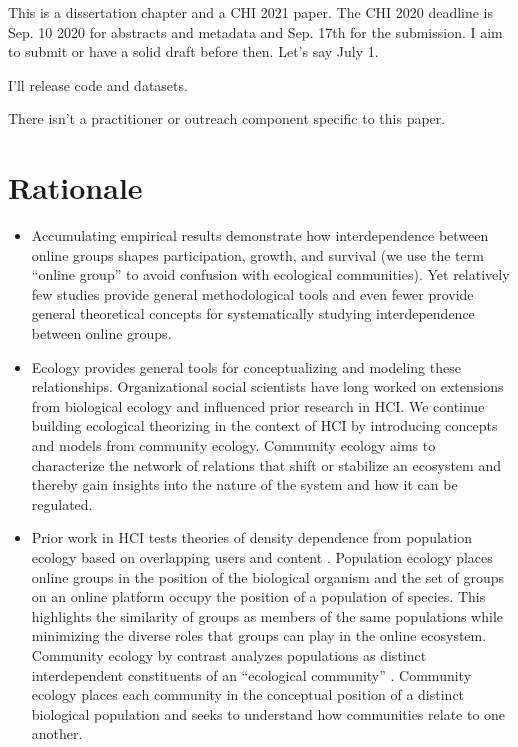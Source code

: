 \documentclass[12pt]{memoir}
\begin{document}
This is a dissertation chapter and a CHI 2021 paper. The CHI 2020 deadline is Sep. 10 2020 for abstracts and metadata and Sep. 17th for the submission. I aim to submit or have a solid draft before then. Let's say July 1. 

I'll release code and datasets.

There isn't a practitioner or outreach component specific to this paper. 

\section{Rationale}

\begin{itemize}
\item Accumulating empirical results demonstrate how interdependence between online groups shapes participation, growth, and survival (we use the term ``online group'' to avoid confusion with ecological communities).  Yet relatively few studies provide general methodological tools and even fewer provide general theoretical concepts for systematically studying interdependence between online groups. 

\item Ecology provides general tools for conceptualizing and modeling these relationships.  Organizational social scientists have long worked on extensions from biological ecology and influenced prior research in HCI.  We continue building ecological theorizing in the context of HCI by introducing concepts and models from community ecology.  Community ecology aims to characterize the network of relations that shift or stabilize an ecosystem and thereby gain insights into the nature of the system and how it can be regulated.  

\item Prior work in HCI tests theories of density dependence from population ecology based on overlapping users and content \citep{zhu_impact_2014,zhu_selecting_2014,wang_impact_2013}.  Population ecology places online groups in the position of the biological organism and the set of groups on an online platform occupy the position of a population of species.  This highlights the similarity of groups as members of the same populations while minimizing the diverse roles that groups can play in the online ecosystem.   Community ecology by contrast analyzes populations as distinct interdependent constituents of an ``ecological community'' \citep{astley_two_1985-1}.  Community ecology places each community in the conceptual position of a distinct biological population and seeks to understand how communities relate to one another.  


\end{itemize}
\end{document}
